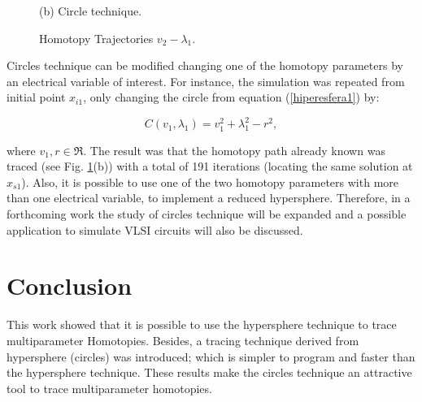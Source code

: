 \documentclass[conference,letterpaper,onecolumn]{IEEEtran}
\begin{document}
\begin{figure}[!hbtp]
\begin{minipage}{\linewidth}
\end{minipage}
\newline
\begin{minipage}{\linewidth}
\centering
(b) Circle technique.
\end{minipage}
\caption{Homotopy Trajectories $v_2-\lambda_1$.}
\label{ht1}
\end{figure}

Circles technique can be modified changing one of the homotopy parameters by an electrical variable of interest. For instance, the simulation was repeated from initial point $x_{i1}$, only changing the circle from equation (\ref{hiperesfera1}) by:

\begin{equation}
C(v_1,\lambda_1)=v_1^2+\lambda_1^2-r^2,
\end{equation}


where $v_1, r \in \Re$. The result was that the homotopy path already known was traced (see Fig. \ref{ht1}(b)) with a total of 191 iterations (locating the same solution at $x_{s1}$). Also, it is possible to use one of the two homotopy parameters with more than one electrical variable, to implement a reduced hypersphere. Therefore, in a forthcoming work the study  of circles technique will be expanded and a possible application to simulate VLSI circuits will also be discussed.

\section{Conclusion}
This work showed that it is possible to use the hypersphere technique to trace multiparameter Homotopies. Besides, a tracing technique derived from hypersphere (circles) was introduced; which is simpler to program and faster than the hypersphere technique. These results make the circles technique an attractive tool to trace multiparameter homotopies.



\end{document}
